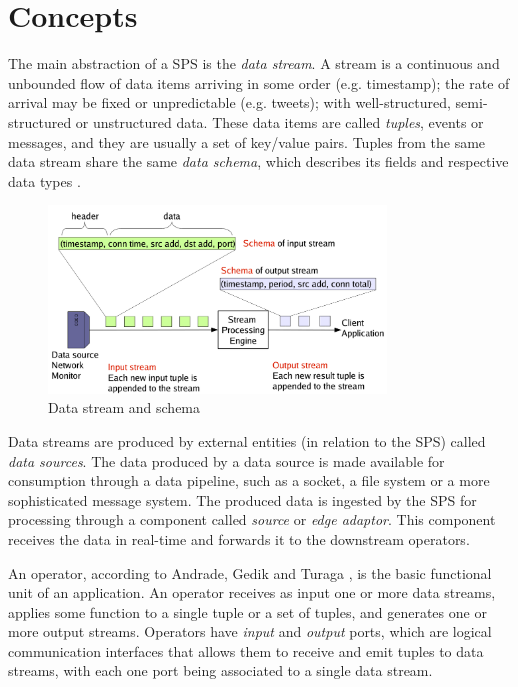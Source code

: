 \documentclass[ppgc,diss,english]{iiufrgs}
\begin{document}
\section{Concepts}
\label{sec:esp:concepts}

The main abstraction of a SPS is the \emph{data stream}. A stream is a continuous and unbounded flow of data items arriving in some order (e.g. timestamp); the rate of arrival may be fixed or unpredictable (e.g. tweets); with well-structured, semi-structured or unstructured data. These data items are called \emph{tuples}, events or messages, and they are usually a set of key/value pairs. Tuples from the same data stream share the same \emph{data schema}, which describes its fields and respective data types \cite{chakravarthy2009stream}.

\begin{figure}[!ht]
	\centering
	\includegraphics[width=0.8\textwidth]{images/streams_schemas.png}
	\caption[Data stream and schema]{Data stream and schema \cite{balazinska2005fault}}
	\label{fig:sps_data_stream}
\end{figure}

Data streams are produced by external entities (in relation to the SPS) called \emph{data sources}. The data produced by a data source is made available for consumption through a data pipeline, such as a socket, a file system or a more sophisticated message system. The produced data is ingested by the SPS for processing through a component called \emph{source} or \emph{edge adaptor}. This component receives the data in real-time and forwards it to the downstream operators.

An operator, according to Andrade, Gedik and Turaga \cite{andrade2014fundamentals}, is the basic functional unit of an application. An operator receives as input one or more data streams, applies some function to a single tuple or a set of tuples, and generates one or more output streams. Operators have \emph{input} and \emph{output} ports, which are logical communication interfaces that allows them to receive and emit tuples to data streams, with each one port being associated to a single data stream.
\end{document}
